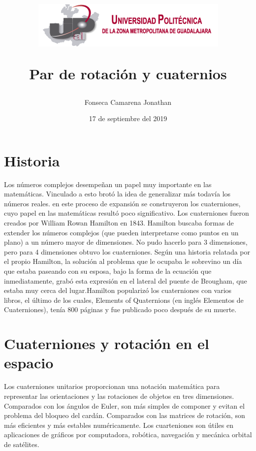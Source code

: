 \documentclass[12pt,a4paper]{report}
\begin{document}
\author{Fonseca Camarena Jonathan}

\title{\begin{center}
\includegraphics[scale=1.5]{Escudo.png} 
\end{center}Par de rotación y cuaternios}

\date{17 de septiembre del 2019}

\maketitle
\section{Historia}
Los números complejos desempeñan un papel muy importante en las matemáticas. Vinculado a esto brotó la idea de generalizar más todavía los números reales. en este proceso de expansión se construyeron los cuaterniones, cuyo papel en las matemáticas resultó poco significativo.
Los cuaterniones fueron creados por William Rowan Hamilton en 1843. Hamilton buscaba formas de extender los números complejos (que pueden interpretarse como puntos en un plano) a un número mayor de dimensiones.  No pudo hacerlo para 3 dimensiones, pero para 4 dimensiones obtuvo los cuaterniones. Según una historia relatada por el propio Hamilton, la solución al problema que le ocupaba le sobrevino un día que estaba paseando con su esposa, bajo la forma de la ecuación que inmediatamente, grabó esta expresión en el lateral del puente de Brougham, que estaba muy cerca del lugar.Hamilton popularizó los cuaterniones con varios libros, el último de los cuales, Elements of Quaternions (en inglés Elementos de Cuaterniones), tenía 800 páginas y fue publicado poco después de su muerte.

\section{Cuaterniones y rotación en el espacio}
Los cuaterniones unitarios proporcionan una notación matemática para representar las orientaciones y las rotaciones de objetos en tres dimensiones. Comparados con los ángulos de Euler, son más simples de componer y evitan el problema del bloqueo del cardán. Comparados con las matrices de rotación, son más eficientes y más estables numéricamente. Los cuarteniones son útiles en aplicaciones de gráficos por computadora, robótica, navegación y mecánica orbital de satélites.
\end{document}
